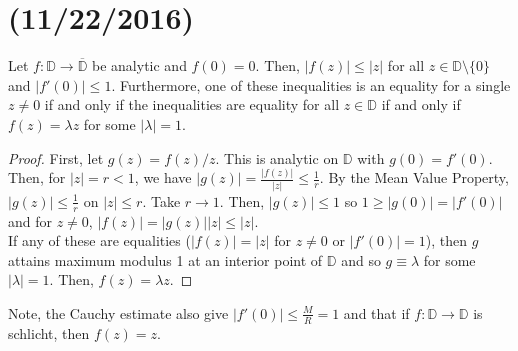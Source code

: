 \documentclass[11pt,leqno,oneside]{amsart}
\numberwithin{thm}{section}
\newcommand{\D}{\mathbb{D}}
\begin{document}
  \section{(11/22/2016)}
  \begin{lem}
    Let $f: \D \to \overline{\D}$ be analytic and $f(0) = 0$. Then,
    $|f(z)| \leq |z|$ for all $z \in \D \setminus \{0\}$ and $|f'(0)|
    \leq 1$. Furthermore, one of these inequalities is an equality
    for a single $z \neq 0$ if and only if the inequalities are equality for
    all $z \in \D$ if and only if $f(z) = \lambda z$ for some
    $|\lambda| = 1$.
  \end{lem}
  \begin{proof}
    First, let $g(z) = f(z)/z$. This is analytic on $\D$ with $g(0) =
    f'(0)$. Then, for $|z| = r < 1$, we have $|g(z)| =
    \frac{|f(z)|}{|z|} \leq \frac{1}{r}$. By the Mean Value Property,
    $|g(z)| \leq \frac{1}{r}$ on $|z| \leq r$. Take $r \to 1$. Then,
    $|g(z)| \leq 1$ so $1 \geq |g(0)| = |f'(0)|$ and for $z \neq 0$,
    $|f(z)| = |g(z)||z| \leq |z|$. \\

    If any of these are equalities ($|f(z)| = |z|$ for $z \neq 0$ or
    $|f'(0)| = 1$), then $g$ attains maximum modulus 1 at an interior
    point of $\D$ and so $g \equiv \lambda$ for some $|\lambda| =
    1$. Then, $f(z) = \lambda z$.
  \end{proof}
  Note, the Cauchy estimate also give $|f'(0)| \leq \frac{M}{R} = 1$
  and that if $f: \D \to \D$ is schlicht, then $f(z) = z$. \\
\end{document}
